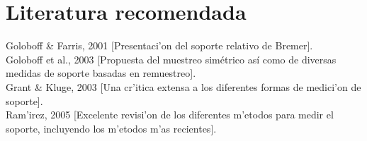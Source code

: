 \section{Literatura recomendada}
\noindent
Goloboff \& Farris, 2001 [Presentaci'on del soporte relativo de Bremer].\\
Goloboff et al., 2003 [Propuesta del muestreo sim\'etrico as\'i como de diversas medidas de soporte basadas en remuestreo].\\
Grant \& Kluge, 2003 [Una cr'itica extensa a los diferentes formas de medici'on de soporte].\\
Ram'irez, 2005 [Excelente revisi'on de los diferentes m'etodos para medir el soporte, incluyendo los m'etodos m'as recientes].
